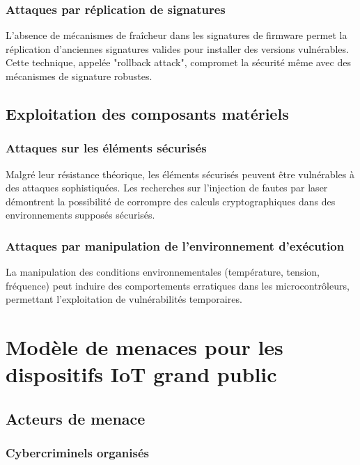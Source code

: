 \subsubsection{Attaques par réplication de signatures}

L'absence de mécanismes de fraîcheur dans les signatures de firmware permet la réplication d'anciennes signatures valides pour installer des versions vulnérables. Cette technique, appelée "rollback attack", compromet la sécurité même avec des mécanismes de signature robustes.

\subsection{Exploitation des composants matériels}

\subsubsection{Attaques sur les éléments sécurisés}

Malgré leur résistance théorique, les éléments sécurisés peuvent être vulnérables à des attaques sophistiquées. Les recherches sur l'injection de fautes par laser démontrent la possibilité de corrompre des calculs cryptographiques dans des environnements supposés sécurisés.

\subsubsection{Attaques par manipulation de l'environnement d'exécution}

La manipulation des conditions environnementales (température, tension, fréquence) peut induire des comportements erratiques dans les microcontrôleurs, permettant l'exploitation de vulnérabilités temporaires.

\section{Modèle de menaces pour les dispositifs IoT grand public}

\subsection{Acteurs de menace}

\subsubsection{Cybercriminels organisés}

